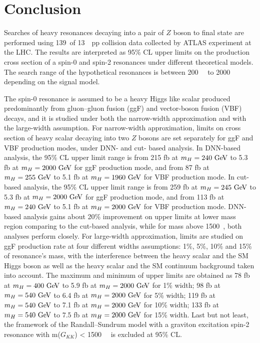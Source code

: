 \section{Conclusion}

Searches of heavy resonances decaying into a pair of $Z$ boson to \llll final state are performed using
139~\ifb of 13~\tev~pp collision data collected by ATLAS experiment at the LHC.
The results are interpreted as 95\% CL upper limits on the production cross section of a spin-0 and spin-2 resonances under different theoretical models.
The search range of the hypothetical resonances is between 200~\gev~ to 2000~\gev~ depending on the signal model.

The spin-0 resonance is assumed to be a heavy Higgs like scalar produced predominantly from gluon–gluon fusion (ggF) and vector-boson fusion (VBF) decays, 
and it is studied under both the narrow-width approximation and with the large-width assumption.
For narrow-width approximation, limits on cross section of heavy scalar decaying into two $Z$ bosons are set separately for ggF and VBF production modes, under DNN- and cut- based analysis.
In DNN-based analysis, the 95\% CL upper limit range is from 215 fb at $m_{H} = 240~\text{Ge\kern -0.1em V}$ to 5.3 fb at $m_{H} = 2000~\text{Ge\kern -0.1em V}$ for ggF production mode, 
and from 87 fb at $m_{H} = 255~\text{Ge\kern -0.1em V}$ to 5.1 fb at $m_{H} = 1960~\text{Ge\kern -0.1em V}$ for VBF production mode.
In cut-based analysis, the 95\% CL upper limit range is from 259 fb at $m_{H} = 245~\text{Ge\kern -0.1em V}$ to 5.3 fb at $m_{H} = 2000~\text{Ge\kern -0.1em V}$ for ggF production mode, 
and from 113 fb at $m_{H} = 240~\text{Ge\kern -0.1em V}$ to 5.1 fb at $m_{H} = 2000~\text{Ge\kern -0.1em V}$ for VBF production mode.
DNN-based analysis gains about 20\% improvement on upper limits at lower mass region comparing to the cut-based analysis, while for mass above 1500~\gev, both analyses perform closely.
For large-width approximation, limits are studied on ggF production rate at four different widths assumptions: 1\%, 5\%, 10\% and 15\% of resonance's mass,
 with the interference between the heavy scalar and the SM Higgs boson as well as the heavy scalar and the SM \ggZZ continuum background taken into account.
The maximum and minimum of upper limits are obtained as 78 fb at $m_{H} = 400~\text{Ge\kern -0.1em V}$ to 5.9 fb at $m_{H} = 2000~\text{Ge\kern -0.1em V}$ for 1\% width;
98 fb at $m_{H} = 540~\text{Ge\kern -0.1em V}$ to 6.4 fb at $m_{H} = 2000~\text{Ge\kern -0.1em V}$ for 5\% width;
119 fb at $m_{H} = 540~\text{Ge\kern -0.1em V}$ to 7.1 fb at $m_{H} = 2000~\text{Ge\kern -0.1em V}$ for 10\% width;
133 fb at $m_{H} = 540~\text{Ge\kern -0.1em V}$ to 7.5 fb at $m_{H} = 2000~\text{Ge\kern -0.1em V}$ for 15\% width.
Last but not least, the framework of the Randall–Sundrum model with a graviton excitation spin-2 resonance with m($G_{KK}$) < 1500~\gev~ is excluded at 95\% CL.
